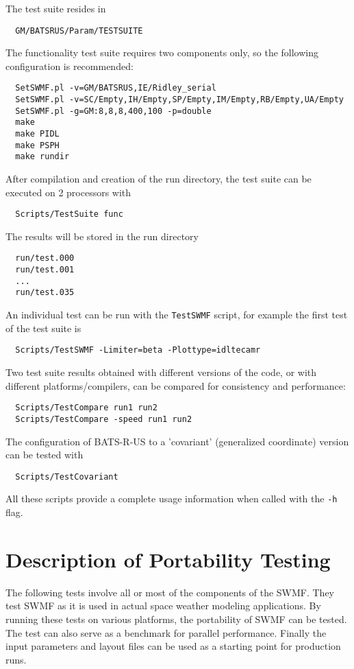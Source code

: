 \documentclass[twoside,10pt]{article}
\begin{document}
The test suite resides in
\begin{verbatim}
  GM/BATSRUS/Param/TESTSUITE
\end{verbatim}
The functionality test suite requires two components only,
so the following configuration is recommended:
\begin{verbatim}
  SetSWMF.pl -v=GM/BATSRUS,IE/Ridley_serial
  SetSWMF.pl -v=SC/Empty,IH/Empty,SP/Empty,IM/Empty,RB/Empty,UA/Empty
  SetSWMF.pl -g=GM:8,8,8,400,100 -p=double
  make
  make PIDL
  make PSPH
  make rundir
\end{verbatim}
After compilation and creation of the run directory, the test suite
can be executed on 2 processors with
\begin{verbatim}
  Scripts/TestSuite func
\end{verbatim}
The results will be stored in the run directory
\begin{verbatim}
  run/test.000
  run/test.001
  ...
  run/test.035
\end{verbatim}
An individual test can be run with the {\tt TestSWMF} script,
for example the first test of the test suite is 
\begin{verbatim}
  Scripts/TestSWMF -Limiter=beta -Plottype=idltecamr
\end{verbatim}
Two test suite results obtained with different versions of the code,
or with different platforms/compilers, can be compared for 
consistency and performance:
\begin{verbatim}
  Scripts/TestCompare run1 run2
  Scripts/TestCompare -speed run1 run2
\end{verbatim}
The configuration of BATS-R-US to a 'covariant' (generalized coordinate) version
can be tested with
\begin{verbatim}
  Scripts/TestCovariant
\end{verbatim}
All these scripts provide a complete usage information when called with the 
{\tt -h} flag.

\section{Description of Portability Testing \label{sec:portability}}

The following tests involve all or most of the components of the SWMF.
They test SWMF as it is used in actual space weather modeling applications.
By running these tests on various platforms, the portability of SWMF
can be tested. The test can also serve as a benchmark for parallel performance.
Finally the input parameters and layout files can be used as a starting
point for production runs.
\end{document}
